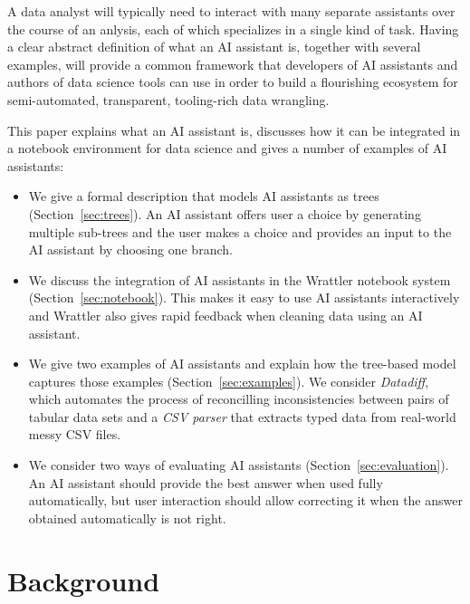 \documentclass{article}
\begin{document}
A data analyst will typically need to interact with many separate assistants over the course of an
anlysis, each of which specializes in a single kind of task. Having a clear abstract definition
of what an AI assistant is, together with several examples, will provide a common framework that 
developers of AI assistants and authors of data science tools can use in order to build a 
flourishing ecosystem for semi-automated, transparent, tooling-rich data wrangling.

This paper explains what an AI assistant is, discusses how it can be integrated in a notebook
environment for data science and gives a number of examples of AI assistants: 
%
\begin{itemize}
\item We give a formal description that models AI assistants as trees (Section~\ref{sec:trees}). 
  An AI assistant offers user a choice by generating multiple sub-trees and the user makes a choice 
  and provides an input to the AI assistant by choosing one branch.
\vspace{-0.2em}
\item We discuss the integration of AI assistants in the Wrattler notebook system (Section~\ref{sec:notebook}). 
  This makes it easy to use AI assistants interactively and Wrattler also gives rapid feedback when 
  cleaning data using an AI assistant. 
\vspace{-0.2em}
\item We give two examples of AI assistants and explain how the tree-based model captures those
  examples (Section~\ref{sec:examples}). We consider \emph{Datadiff}, which automates the process of reconcilling 
  inconsistencies between pairs of tabular data sets and a \emph{CSV parser} that extracts typed
  data from real-world messy CSV files.
\vspace{-0.2em}
\item We consider two ways of evaluating AI assistants (Section~\ref{sec:evaluation}). An AI 
  assistant should provide the best answer when used fully automatically, but user interaction 
  should allow correcting it when the answer obtained automatically is not right.
\end{itemize}

\section{Background}
\label{sec:background}
\end{document}
